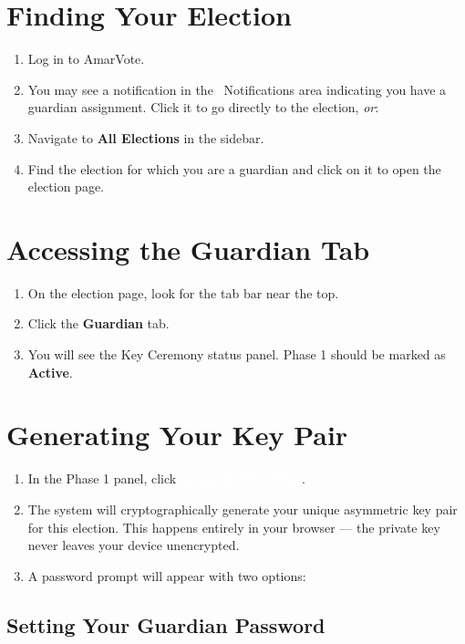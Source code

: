 \documentclass[12pt,a4paper]{book}
\newcommand{\uibutton}[1]{\colorbox{guardgreen}{\textcolor{white}{\small\textbf{#1}}}}
\newcommand{\uimenu}[1]{\textbf{\color{guardgreen}#1}}
\begin{document}
\section{Finding Your Election}

\begin{enumerate}
  \item Log in to AmarVote.
  \item You may see a notification in the \faiBell\ Notifications area indicating you have a guardian assignment. Click it to go directly to the election, \emph{or}:
  \item Navigate to \uimenu{All Elections} in the sidebar.
  \item Find the election for which you are a guardian and click on it to open the election page.
\end{enumerate}

\section{Accessing the Guardian Tab}

\begin{enumerate}
  \item On the election page, look for the tab bar near the top.
  \item Click the \uimenu{Guardian} tab.
  \item You will see the Key Ceremony status panel. Phase 1 should be marked as \textbf{Active}.
\end{enumerate}

\section{Generating Your Key Pair}

\begin{enumerate}
  \item In the Phase 1 panel, click \uibutton{Generate Key Pair}.
  \item The system will cryptographically generate your unique asymmetric key pair for this election. This happens entirely in your browser --- the private key never leaves your device unencrypted.
  \item A password prompt will appear with two options:
\end{enumerate}

\subsection{Setting Your Guardian Password}
\end{document}
